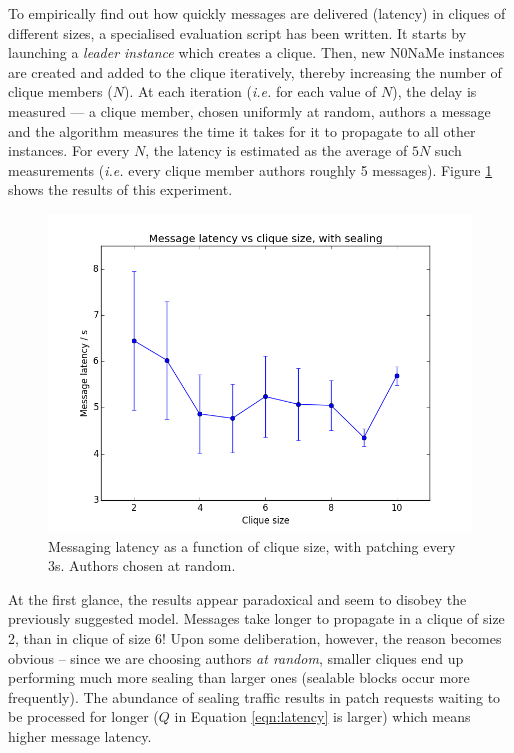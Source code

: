 \documentclass[a4paper, 12pt]{report}
\newcommand{\funkytt}{\fontfamily{AnonymousPro}\selectfont}
\begin{document}
To empirically find out how quickly messages are delivered (latency) in cliques of different sizes, a specialised evaluation script has been written. It starts by launching a \emph{leader instance} which creates a clique. Then, new {\funkytt N0NaMe} instances are created and added to the clique iteratively, thereby increasing the number of clique members ($N$). At each iteration (\textit{i.e.} for each value of $N$), the delay is measured --- a clique member, chosen uniformly at random, authors a message and the algorithm measures the time it takes for it to propagate to all other instances. For every $N$, the latency is estimated as the average of $5N$ such measurements (\textit{i.e.} every clique member authors roughly 5 messages). Figure \ref{fig:latency_vs_N} shows the results of this experiment.

\begin{figure}[H]
    \captionsetup{width=0.8\textwidth}
    \centering
    \includegraphics[width=0.8\linewidth]{pics/eval/latency_vs_N_seal.png}
    \caption{\label{fig:latency_vs_N} Messaging latency as a function of clique size, with patching every 3s. Authors chosen at random.}
\end{figure}

At the first glance, the results appear paradoxical and seem to disobey the previously suggested model. Messages take longer to propagate in a clique of size 2, than in clique of size 6! Upon some deliberation, however, the reason becomes obvious -- since we are choosing authors \emph{at random}, smaller cliques end up performing much more sealing than larger ones (sealable blocks occur more frequently). The abundance of sealing traffic results in patch requests waiting to be processed for longer ($Q$ in Equation \ref{eqn:latency} is larger) which means higher message latency. \\
\end{document}
